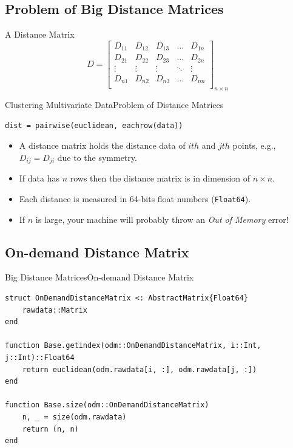 \documentclass[11pt]{beamer}
\begin{document}
\subsection{Problem of Big Distance Matrices}

\begin{frame}[fragile]{A Distance Matrix}
$$
D = \begin{bmatrix}
D_{11} & D_{12} & D_{13} & \ldots & D_{1n} \\
D_{21} & D_{22} & D_{23} & \ldots & D_{2n} \\
\vdots & \vdots & \vdots & \ddots & \vdots \\
D_{n1} & D_{n2} & D_{n3} & \ldots & D_{nn} \\
\end{bmatrix}_{n \times n}
$$
\end{frame}

\begin{frame}[fragile]{Clustering Multivariate Data}{Problem of Distance Matrices}
\begin{lstlisting}
dist = pairwise(euclidean, eachrow(data))
\end{lstlisting}
\begin{itemize}
	\item A distance matrix holds the distance data of $ith$ and $jth$ points, e.g., $D_{ij} = D_{ji}$ due to the symmetry.
	\item If data has $n$ rows then the distance matrix is in dimension of $n \times n$. 
	\item Each distance is measured in 64-bits float numbers (\texttt{Float64}).
	\item If $n$ is large, your machine will probably throw an \emph{Out of Memory} error!
\end{itemize}
\end{frame}



\subsection{On-demand Distance Matrix}
\begin{frame}[fragile]{Big Distance Matrices}{On-demand Distance Matrix}
\begin{lstlisting}[basicstyle=\tiny]
struct OnDemandDistanceMatrix <: AbstractMatrix{Float64}
	rawdata::Matrix
end

function Base.getindex(odm::OnDemandDistanceMatrix, i::Int, j::Int)::Float64
	return euclidean(odm.rawdata[i, :], odm.rawdata[j, :])
end 

function Base.size(odm::OnDemandDistanceMatrix)
	n, _ = size(odm.rawdata)
	return (n, n)
end 
\end{lstlisting}
\end{frame} 
\end{document}
